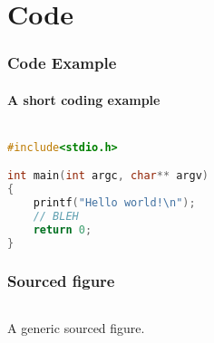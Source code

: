 \section{Code}

\begin{frame}[fragile,label=CODEFRAME]
\frametitle{Code Example}
\framesubtitle{A short coding example}

\begin{lstlisting}[language=C,basicstyle=\ttfamily]

#include<stdio.h>

int main(int argc, char** argv)
{
    printf("Hello world!\n");
    // BLEH
    return 0;
}

\end{lstlisting}

\end{frame}


\begin{frame}
    \frametitle{Sourced figure}


    \begin{columns}
        \begin{column}{0.7\textwidth}

            A generic sourced figure.

        \end{column}
        \begin{column}{0.3\textwidth}


        \end{column}
    \end{columns}


\end{frame}




